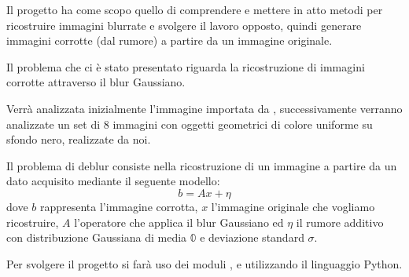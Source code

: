 Il progetto ha come scopo quello di comprendere e mettere in atto metodi per ricostruire 
immagini blurrate e svolgere il lavoro opposto, quindi generare immagini corrotte (dal rumore) a partire da un immagine 
originale. 

Il problema che ci è stato presentato riguarda la ricostruzione di 
immagini corrotte attraverso il blur Gaussiano.

Verrà analizzata inizialmente l'immagine  importata da
, successivamente verranno analizzate un set di 8 immagini con oggetti geometrici di colore uniforme su sfondo
 nero, realizzate da noi.

Il problema di deblur consiste nella ricostruzione di un immagine a partire da un dato acquisito mediante il seguente modello:
\[b=Ax+\eta\]
dove $b$ rappresenta l'immagine corrotta, $x$ l'immagine originale che vogliamo ricostruire, $A$ l'operatore che applica il 
blur Gaussiano ed $\eta$ il rumore additivo con distribuzione Gaussiana di  media $\mathbb{0}$ e deviazione standard $\sigma$.

Per svolgere il progetto si farà uso dei moduli ,  e 
utilizzando il linguaggio Python.